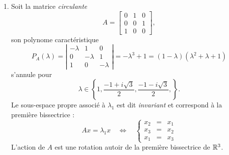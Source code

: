 \begin{enumerate}
$$ $$
 donc le sous-espace propre associé est de dimension 1.
 \item Soit la matrice {\em circulante}
 $$
 A = \left[\begin{array}{rrr} 0 & 1 & 0 \\ 0 & 0 & 1 \\ 1 & 0 & 0 \end{array}\right],
 $$ 
 son polynome caractéristique
 $$
 P_A(\lambda) 
 = \left|\begin{array}{rrr} -\lambda & 1 & 0 \\ 0 & -\lambda & 1 \\ 1 & 0 & -\lambda \end{array}\right|
 = -\lambda^3 + 1 = (1- \lambda)(\lambda^2 + \lambda + 1)
 $$
 s'annule pour 
 $$
 \lambda \in \left\{1, \frac{-1+i\sqrt{3}}{2}, \frac{-1-i\sqrt{3}}{2}, \right\}.
 $$
 Le sous-espace propre associé à $\lambda_1$ est dit {\em invariant} et correspond à la première bissectrice : 
 $$
 A x = \lambda_1 x \quad \Leftrightarrow \quad 
 \left\{\begin{array}{rcl} x_2 & = & x_1 \\ x_3 & = & x_2 \\ x_1 & = & x_3 \end{array} \right.
 $$
 L'action de $A$ est une rotation autoir de la première bissectrice de $\mathbb{R}^3$.
\end{enumerate}


